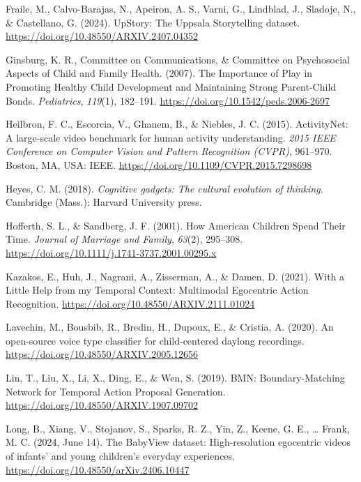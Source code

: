\documentclass[
  man,floatsintext]{apa6}
\newlength{\cslhangindent}
\newenvironment{CSLReferences}[2] %
 {\begin{list}{}{%
  \setlength{\itemindent}{0pt}
  \setlength{\leftmargin}{0pt}
  \setlength{\parsep}{0pt}
  \ifodd #1
   \setlength{\leftmargin}{\cslhangindent}
   \setlength{\itemindent}{-1\cslhangindent}
  \fi
  \setlength{\itemsep}{#2\baselineskip}}}
 {\end{list}}
\begin{document}
\begin{CSLReferences}{1}{0}
Fraile, M., Calvo-Barajas, N., Apeiron, A. S., Varni, G., Lindblad, J., Sladoje, N., \& Castellano, G. (2024). {UpStory}: The {Uppsala Storytelling} dataset. \url{https://doi.org/10.48550/ARXIV.2407.04352}

Ginsburg, K. R., Committee on Communications, \& Committee on Psychosocial Aspects of Child and Family Health. (2007). The {Importance} of {Play} in {Promoting Healthy Child Development} and {Maintaining Strong Parent-Child Bonds}. \emph{Pediatrics}, \emph{119}(1), 182--191. \url{https://doi.org/10.1542/peds.2006-2697}

Heilbron, F. C., Escorcia, V., Ghanem, B., \& Niebles, J. C. (2015). {ActivityNet}: {A} large-scale video benchmark for human activity understanding. \emph{2015 {IEEE Conference} on {Computer Vision} and {Pattern Recognition} ({CVPR})}, 961--970. Boston, MA, USA: IEEE. \url{https://doi.org/10.1109/CVPR.2015.7298698}

Heyes, C. M. (2018). \emph{Cognitive gadgets: The cultural evolution of thinking}. Cambridge (Mass.): Harvard University press.

Hofferth, S. L., \& Sandberg, J. F. (2001). How {American Children Spend Their Time}. \emph{Journal of Marriage and Family}, \emph{63}(2), 295--308. \url{https://doi.org/10.1111/j.1741-3737.2001.00295.x}

Kazakos, E., Huh, J., Nagrani, A., Zisserman, A., \& Damen, D. (2021). With a {Little Help} from my {Temporal Context}: {Multimodal Egocentric Action Recognition}. \url{https://doi.org/10.48550/ARXIV.2111.01024}

Lavechin, M., Bousbib, R., Bredin, H., Dupoux, E., \& Cristia, A. (2020). An open-source voice type classifier for child-centered daylong recordings. \url{https://doi.org/10.48550/ARXIV.2005.12656}

Lin, T., Liu, X., Li, X., Ding, E., \& Wen, S. (2019). {BMN}: {Boundary-Matching Network} for {Temporal Action Proposal Generation}. \url{https://doi.org/10.48550/ARXIV.1907.09702}

Long, B., Xiang, V., Stojanov, S., Sparks, R. Z., Yin, Z., Keene, G. E., \ldots{} Frank, M. C. (2024, June 14). The {BabyView} dataset: {High-resolution} egocentric videos of infants' and young children's everyday experiences. \url{https://doi.org/10.48550/arXiv.2406.10447}


\end{CSLReferences}
\end{document}
